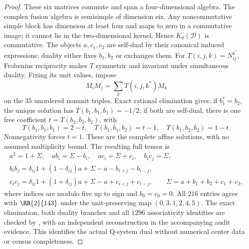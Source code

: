 \begin{proof}
These six matrices commute and span a four-dimensional algebra.
The complex fusion algebra is semisimple of dimension six. Any
noncommutative simple block has dimension at least four and maps to
zero in a commutative image; it cannot lie in the two-dimensional
kernel. Hence $K_0(\mathcal D)$ is commutative.
The objects $a,c_1,c_2$ are self-dual by their canonical induced
expressions; duality either fixes $b_1,b_2$ or exchanges them.
For $T(i,j,k)=N_{ij}^{k^*}$, Frobenius reciprocity makes $T$ symmetric
and invariant under simultaneous duality. Fixing its unit values, impose
\[
 M_iM_j=\sum_k T(i,j,k^*)M_k
\]
on the $35$ unordered nonunit triples. Exact rational elimination gives:
if $b_1^*=b_2$, the unique solution has $T(b_1,b_1,b_1)=-1/2$;
if both are self-dual, there is one free coefficient
$t=T(b_2,b_2,b_2)$, with
\[
 T(b_1,b_1,b_1)=2-t,\quad T(b_1,b_1,b_2)=t-1,\quad
 T(b_1,b_2,b_2)=1-t.
\]
Nonnegativity forces $t=1$. These are the complete affine solutions,
with no assumed multiplicity bound. The resulting full tensor is
\begin{gather*}
 a^2=1+\Sigma,\quad ab_i=\Sigma-b_i,\quad ac_i=\Sigma+c_i,
 \quad b_ic_j=\Sigma,\\
 b_ib_j=\delta_{ij}1+(1-\delta_{ij})a+\Sigma-a-b_{i+j}-b_{i-j},\\
 c_ic_j=\delta_{ij}1+(1+\delta_{ij})a+\Sigma-a+c_{i+j}+c_{i-j},
 \qquad \Sigma=a+b_1+b_2+c_1+c_2,
\end{gather*}
where indices are modulo five up to sign and $b_0=c_0=0$.
All $216$ entries agree with $\RR{2}{143}$ under the unit-preserving map
$(0,3,1,2,4,5)$. The exact elimination, both duality branches and all
$1296$ associativity identities are checked by
, with
an independent reconstruction in the accompanying audit evidence.
This identifies the actual Q-system dual without numerical center data
or census completeness.
\end{proof}

